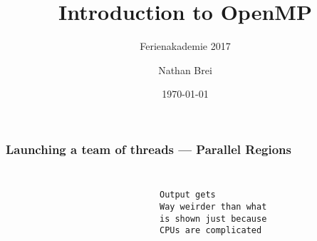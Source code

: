 \documentclass[handout]{beamer}
\title{Introduction to OpenMP}
\subtitle{Ferienakademie 2017}
\author{Nathan Brei}
\institute{}
\date\today
\begin{document}
\begin{frame}
  \titlepage
\end{frame}

\begin{frame}[fragile]
  \frametitle{Launching a team of threads --- Parallel Regions}
  \begin{columns}[t]%
    \begin{column}{0.65\textwidth}
      \inputminted{c}{src/ex1.c}
    \end{column}
    \pause
    \begin{column}{0.4\textwidth}
      \inputminted{text}{output/ex1.txt}
      \begin{verbatim}
        Output gets
        Way weirder than what
        is shown just because
        CPUs are complicated
      \end{verbatim}
    \end{column}
  \end{columns}
  \pause
\end{frame}
\end{document}
